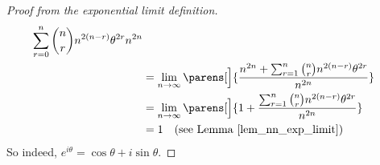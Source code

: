 \begin{proof}[Proof from the exponential limit definition]
\begin{align*}
{                           {\sum_{r = 0}^n \binom nr n^{2(n - r)} \theta^{2r}}
                           {n^{2n}}} \\
                       &= \lim_{n \to \infty} \parens[\Big]
                          {\frac
                           {n^{2n} +
                            \sum_{r = 1}^n \binom nr n^{2(n - r)} \theta^{2r}}
                           {n^{2n}}} \\
                       &= \lim_{n \to \infty} \parens[\Big]
                          {1 + \frac
                           {\sum_{r = 1}^n \binom nr n^{2(n - r)} \theta^{2r}}
                           {n^{2n}}} \\
                       &= 1 \quad \text{(see Lemma \ref{lem_nn_exp_limit})}
 \end{align*}
 So indeed, \(e^{i \theta} = \cos \theta + i \sin \theta\).
\end{proof}
